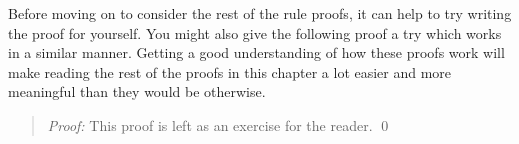 Before moving on to consider the rest of the rule proofs, it can help to try writing the proof for yourself. 
You might also give the following proof a try which works in a similar manner.
Getting a good understanding of how these proofs work will make reading the rest of the proofs in this chapter a lot easier and more meaningful than they would be otherwise.




\begin{quote} 
  \textit{Proof:}
  This proof is left as an exercise for the reader.
  \qed
\end{quote}


